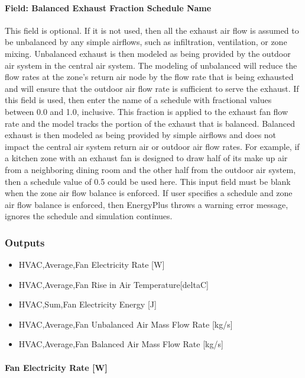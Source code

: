 \paragraph{Field: Balanced Exhaust Fraction Schedule Name}\label{field-balanced-exhaust-fraction-schedule-name}

This field is optional. If it is not used, then all the exhaust air flow is assumed to be unbalanced by any simple airflows, such as infiltration, ventilation, or zone mixing. Unbalanced exhaust is then modeled as being provided by the outdoor air system in the central air system. The modeling of unbalanced will reduce the flow rates at the zone's return air node by the flow rate that is being exhausted and will ensure that the outdoor air flow rate is sufficient to serve the exhaust. If this field is used, then enter the name of a schedule with fractional values between 0.0 and 1.0, inclusive. This fraction is applied to the exhaust fan flow rate and the model tracks the portion of the exhaust that is balanced. Balanced exhaust is then modeled as being provided by simple airflows and does not impact the central air system return air or outdoor air flow rates. For example, if a kitchen zone with an exhaust fan is designed to draw half of its make up air from a neighboring dining room and the other half from the outdoor air system, then a schedule value of 0.5 could be used here. This input field must be blank when the zone air flow balance is enforced. If user specifies a schedule and zone air flow balance is enforced, then EnergyPlus throws a warning error message, ignores the schedule and simulation continues.   

\subsubsection{Outputs}\label{outputs-3-007}

\begin{itemize}
\item
  HVAC,Average,Fan Electricity Rate {[}W{]}
\item
  HVAC,Average,Fan Rise in Air Temperature{[}deltaC{]}
\item
  HVAC,Sum,Fan Electricity Energy {[}J{]}
\item
  HVAC,Average,Fan Unbalanced Air Mass Flow Rate {[}kg/s{]}
\item
  HVAC,Average,Fan Balanced Air Mass Flow Rate {[}kg/s{]}
\end{itemize}

\paragraph{Fan Electricity Rate {[}W{]}}\label{fan-electric-power-w-3}

